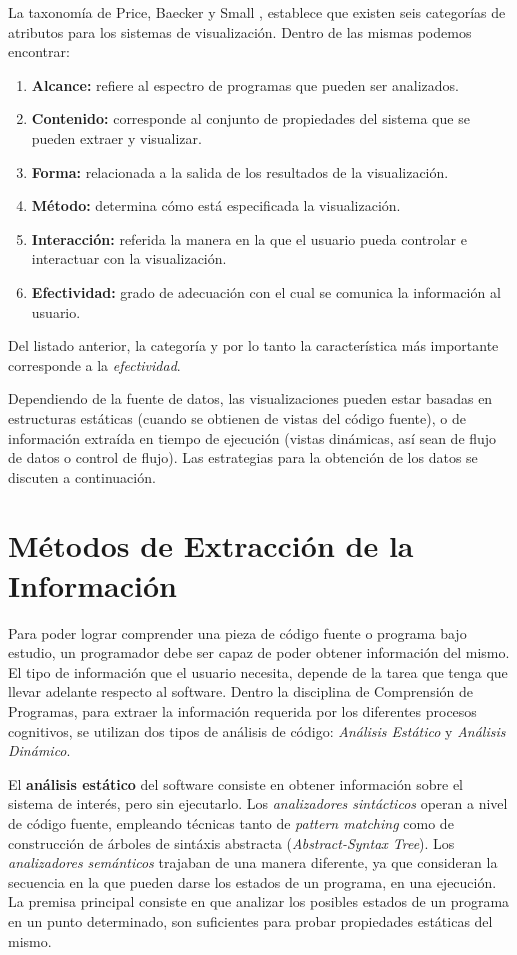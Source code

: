 La taxonomía de Price, Baecker y Small \cite{PriceBaeckerSmall93}, establece que
existen seis categorías de atributos para los sistemas de visualización.
Dentro de las mismas podemos encontrar:
\begin{enumerate}
    \item \textbf{Alcance:} refiere al espectro de programas que pueden ser analizados.
    \item \textbf{Contenido:} corresponde al conjunto de propiedades del sistema que se pueden
    extraer y visualizar.
    \item \textbf{Forma:} relacionada a la salida de los resultados de la visualización.
    \item \textbf{Método:} determina cómo está especificada la visualización.
    \item \textbf{Interacción:} referida la manera en la que el usuario pueda controlar e
    interactuar con la visualización.
    \item \textbf{Efectividad:} grado de adecuación con el cual se comunica la información
    al usuario.
\end{enumerate}
Del listado anterior, la categoría y por lo tanto la característica más importante corresponde
a la \textit{efectividad}.

Dependiendo de la fuente de datos, las visualizaciones pueden estar basadas en
estructuras estáticas (cuando se obtienen de vistas del código fuente), o de
información extraída en tiempo de ejecución (vistas dinámicas, así sean de flujo de datos
o control de flujo). \cite{PetreDeQuincey06}
Las estrategias para la obtención de los datos se discuten a continuación.

\section{Métodos de Extracción de la Información}

Para poder lograr comprender una pieza de código fuente o programa bajo estudio, un
programador debe ser capaz de poder obtener información del mismo.
El tipo de información que el usuario necesita, depende de la tarea que tenga que llevar
adelante respecto al software.
Dentro la disciplina de Comprensión de Programas, para extraer la información requerida 
por los diferentes procesos cognitivos, se utilizan dos tipos de análisis de código:
\textit{Análisis Estático} y \textit{Análisis Dinámico}.

El \textbf{análisis estático} del software consiste en obtener información sobre el 
sistema de interés, pero sin ejecutarlo.
Los \textit{analizadores sintácticos} operan a nivel de código fuente, empleando
técnicas tanto de \textit{pattern matching} como de construcción de árboles de sintáxis
abstracta (\textit{Abstract-Syntax Tree}).
Los \textit{analizadores semánticos} trajaban de una manera diferente, ya que consideran
la secuencia en la que pueden darse los estados de un programa, en una ejecución.
La premisa principal consiste en que analizar los posibles estados de un programa en un
punto determinado, son suficientes para probar propiedades estáticas del mismo.
\cite{Cousot77}

